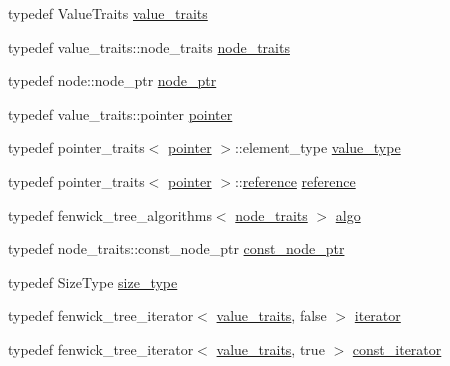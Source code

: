 \begin{DoxyCompactItemize}
\item 
typedef Value\+Traits \hyperlink{classboost_1_1intrusive_1_1fenwick__tree__impl_a2e87a9b3164c911991b62a4405bdca5f}{value\+\_\+traits}
\item 
typedef value\+\_\+traits\+::node\+\_\+traits \hyperlink{classboost_1_1intrusive_1_1fenwick__tree__impl_a6b28754cf23051d44f0caae912a22b04}{node\+\_\+traits}
\item 
typedef node\+::node\+\_\+ptr \hyperlink{classboost_1_1intrusive_1_1fenwick__tree__impl_a6546b8d5a2d043e99e5e28853a8da248}{node\+\_\+ptr}
\item 
typedef value\+\_\+traits\+::pointer \hyperlink{classboost_1_1intrusive_1_1fenwick__tree__impl_a5900d4b71e9c5715db38a848acbe270b}{pointer}
\item 
typedef pointer\+\_\+traits$<$ \hyperlink{classboost_1_1intrusive_1_1fenwick__tree__impl_a5900d4b71e9c5715db38a848acbe270b}{pointer} $>$\+::element\+\_\+type \hyperlink{classboost_1_1intrusive_1_1fenwick__tree__impl_aefd70a2712872e79b867c1a5c59a4a26}{value\+\_\+type}
\item 
typedef pointer\+\_\+traits$<$ \hyperlink{classboost_1_1intrusive_1_1fenwick__tree__impl_a5900d4b71e9c5715db38a848acbe270b}{pointer} $>$\+::\hyperlink{classboost_1_1intrusive_1_1fenwick__tree__impl_a5fb6f0db4d5227a537e8a07eb1378e8e}{reference} \hyperlink{classboost_1_1intrusive_1_1fenwick__tree__impl_a5fb6f0db4d5227a537e8a07eb1378e8e}{reference}
\item 
typedef fenwick\+\_\+tree\+\_\+algorithms$<$ \hyperlink{classboost_1_1intrusive_1_1fenwick__tree__impl_a6b28754cf23051d44f0caae912a22b04}{node\+\_\+traits} $>$ \hyperlink{classboost_1_1intrusive_1_1fenwick__tree__impl_afd6f10ecfa8d7232152bc249cc61d246}{algo}
\item 
typedef node\+\_\+traits\+::const\+\_\+node\+\_\+ptr \hyperlink{classboost_1_1intrusive_1_1fenwick__tree__impl_a2c2dc37954c7b844f875adecb7d668a1}{const\+\_\+node\+\_\+ptr}
\item 
typedef Size\+Type \hyperlink{classboost_1_1intrusive_1_1fenwick__tree__impl_abf24adccfa8e65e8a382d4e25f906381}{size\+\_\+type}
\item 
typedef fenwick\+\_\+tree\+\_\+iterator$<$ \hyperlink{classboost_1_1intrusive_1_1fenwick__tree__impl_a2e87a9b3164c911991b62a4405bdca5f}{value\+\_\+traits}, false $>$ \hyperlink{classboost_1_1intrusive_1_1fenwick__tree__impl_a6293502e34de9b16ae198ec557c82132}{iterator}
\item 
typedef fenwick\+\_\+tree\+\_\+iterator$<$ \hyperlink{classboost_1_1intrusive_1_1fenwick__tree__impl_a2e87a9b3164c911991b62a4405bdca5f}{value\+\_\+traits}, true $>$ \hyperlink{classboost_1_1intrusive_1_1fenwick__tree__impl_a54559dc10b4a93114b1048ad9e41b5f1}{const\+\_\+iterator}

\end{DoxyCompactItemize}
